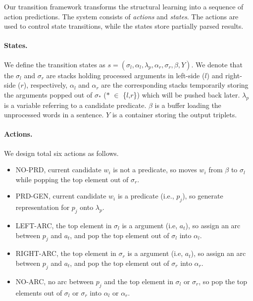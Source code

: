 \documentclass[letterpaper]{article} \usepackage{aaai21}  \usepackage{times}  \usepackage{helvet} \usepackage{courier}  \usepackage[hyphens]{url}  \usepackage{graphicx} \urlstyle{rm} \def\UrlFont{\rm}  \usepackage{natbib}  \usepackage{caption}
\begin{document}
\begin{CJK}{UTF8}{gbsn}
Our transition framework transforms the structural learning into a sequence of action predictions.
The system consists of \emph{actions} and \emph{states}.
The actions are used to control state transitions, while the states store partially parsed results.


\paragraph{States.}
We define the transition states as $s = (\sigma_l, \alpha_l, \lambda_p, \alpha_r, \sigma_r, \beta, Y)$.
We denote that the $\sigma_l$ and $\sigma_r$ are stacks holding processed arguments in left-side ($l$) and right-side ($r$), respectively,
$\alpha_l$ and $\alpha_r$ are the corresponding stacks temporarily storing the arguments popped out of $\sigma_*$ ($*$ $\in$ \{$l$,$r$\}) which will be pushed back later.
$\lambda_p$ is a variable referring to a candidate predicate.
$\beta$ is a buffer loading the unprocessed words in a sentence.
$Y$ is a container storing the output triplets.


\paragraph{Actions.}

We design total six actions as follows.
\begin{itemize}
\setlength{\topsep}{0pt}
\setlength{\itemsep}{0pt}
\setlength{\parsep}{0pt}
\setlength{\parskip}{0pt}
    \item NO-PRD, current candidate $w_i$ is not a predicate, so moves $w_i$ from $\beta$ to $\sigma_l$ while popping the top element out of $\sigma_r$.


    \item PRD-GEN, current candidate $w_i$ is a predicate (i.e., $p_j$), so generate representation for $p_j$ onto $\lambda_p$.


    \item LEFT-ARC, the top element in $\sigma_l$ is a argument (i.e, $a_t$), so assign an arc between $p_j$ and $a_t$, and pop the top element out of $\sigma_l$ into $\alpha_l$.

    \item RIGHT-ARC, the top element in $\sigma_r$ is a argument (i.e, $a_t$), so assign an arc between $p_j$ and $a_t$, and pop the top element out of $\sigma_r$ into $\alpha_r$.


    \item NO-ARC, no arc between $p_j$ and the top element in $\sigma_l$ or $\sigma_r$, so pop the top elements out of $\sigma_l$ or $\sigma_r$ into $\alpha_l$ or $\alpha_r$.



\end{itemize}
\end{CJK}
\end{document}
